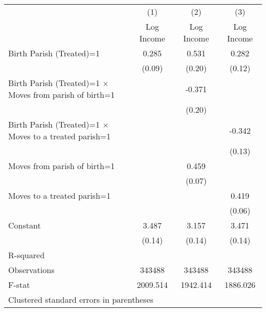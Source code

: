 \begin{tabular}{l*{3}{c}}
    \hline\hline
                        &\multicolumn{1}{c}{(1)}&\multicolumn{1}{c}{(2)}&\multicolumn{1}{c}{(3)}\\
                        &\multicolumn{1}{c}{Log Income}&\multicolumn{1}{c}{Log Income}&\multicolumn{1}{c}{Log Income}\\
    \hline
    Birth Parish (Treated)=1&         0.285\sym{***}            &       0.531\sym{**} &       0.282\sym{*}  \\
                        &           (0.09)          &      (0.20)         &      (0.12)         \\
    Birth Parish (Treated)=1 $\times$ Moves from parish of birth=1&                     &      -0.371         &                     \\
                        &                     &      (0.20)         &                     \\
    Birth Parish (Treated)=1 $\times$ Moves to a treated parish=1&                     &                     &      -0.342\sym{**} \\
                        &                     &                     &      (0.13)         \\
    Moves from parish of birth=1&                     &       0.459\sym{***}&                     \\
    &                     &      (0.07)         &                     \\
    
    Moves to a treated parish=1&                     &                     &       0.419\sym{***}\\
                        &                     &                     &      (0.06)         \\
    Constant            &       3.487\sym{***}&       3.157\sym{***}&       3.471\sym{***}\\
                        &      (0.14)         &      (0.14)         &      (0.14)         \\
    \hline
    
    \hline
    R-squared           &                     &                     &                     \\
    Observations        &      343488         &      343488         &      343488         \\
    F-stat              &    2009.514         &    1942.414         &    1886.026         \\
    \hline\hline
    \multicolumn{4}{l}{\footnotesize Clustered standard errors in parentheses}\\
    \end{tabular}
    